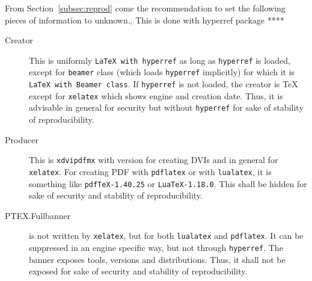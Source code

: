 \documentclass[a4paper]{article}%
\newcommand{\pdflatex}{\texttt{pdflatex}}
\newcommand{\lualatex}{\texttt{lualatex}}
\newcommand{\xelatex}{\texttt{xelatex}}
\newcommand{\cmd}[1]{\texttt{\textbackslash#1}}
\begin{document}
From Section~\ref{subsec:reprod} come the recommendation 
to set the following pieces of information to unknown., 
This is done with hyperref package **** 
%
\begin{description}
  \item[Creator] This is uniformly \texttt{LaTeX with hyperref} 
  as long as \texttt{hyperref} is loaded, except for \texttt{beamer} class 
  (which loads \texttt{hyperref} implicitly)
  for which it is \texttt{LaTeX with Beamer class}. 
  If \texttt{hyperref} is not loaded, 
  the creator is \TeX{} except for \xelatex{} which shows engine and creation date. 
  Thus, it is advisable in general for security but without \texttt{hyperref} 
  for sake of stability of reproducibility. 
  \item[Producer] This is \texttt{xdvipdfmx} with version for creating DVIs 
  and in general for \xelatex. 
  For creating PDF with \pdflatex{} or with \lualatex, 
  it is something like \texttt{pdfTeX-1.40.25} or \texttt{LuaTeX-1.18.0}. 
  This shall be hidden for sake of security and stability of reproducibility. 



  
  \item[PTEX.Fullbanner] is not written by \xelatex, 
  but for both \lualatex{} and \pdflatex. 
  It can be suppressed in an engine specific way, 
  but not through \texttt{hyperref}. 
  The banner exposes tools, versions and distributions. 
  Thus, it shall not be exposed for sake of security and stability of reproducibility. 
 

\end{description}
\end{document}
